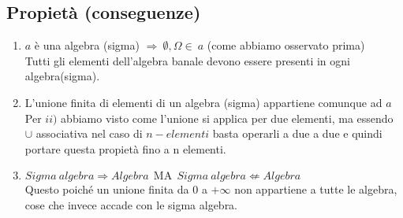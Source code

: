 \subsection{Propietà (conseguenze)}
\begin{enumerate}
\item $a$ è una algebra (sigma) $\Rightarrow \: \emptyset,\Omega \in \: a$ (come abbiamo osservato prima)\\Tutti gli elementi dell'algebra banale devono essere presenti in ogni algebra(sigma).
\item L'unione finita di elementi di un algebra (sigma) appartiene comunque ad $a$\\ Per $ii)$ abbiamo visto come l'unione si applica per due elementi, ma essendo $\cup$ associativa nel caso di $n-elementi$ basta operarli a due a due e quindi portare questa propietà fino a n elementi.
\item $ Sigma\:algebra \Rightarrow Algebra \:\:\text{MA}\:\: Sigma\: algebra \not \Leftarrow Algebra $\\
Questo poiché un unione finita da 0 a $+\infty$ non appartiene a tutte le algebra, cose che invece accade con le sigma algebra.
\end{enumerate}







